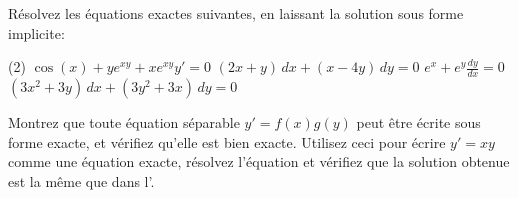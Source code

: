 \begin{exercise}
	Résolvez les équations exactes suivantes, en laissant la solution sous forme implicite:
	\begin{tasks}(2)
		\task $\cos(x)+ye^{xy} + xe^{xy} y' = 0$
		\task $(2x+y)\, dx + (x-4y) \, dy = 0$
		\task $e^x + e^y \frac{dy}{dx} = 0$
		\task $(3x^2+3y)\,dx + (3y^2+3x)\, dy = 0$
	\end{tasks}
\end{exercise}


\begin{exercise}
\leavevmode
	\begin{tasks}
	\task Montrez que toute équation séparable $y' = f(x)g(y)$ peut être écrite sous forme exacte, et vérifiez qu'elle est bien  exacte.
	\task Utilisez ceci pour écrire $y' = xy$ comme une équation exacte,
			résolvez l'équation et vérifiez que la solution obtenue est la même que dans l'.
	\end{tasks}
\end{exercise}

